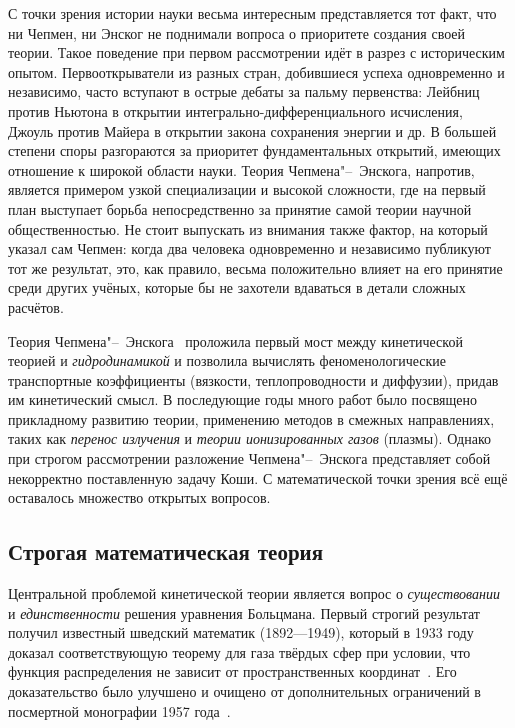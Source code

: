 \documentclass[a4paper, 12pt, oneside]{article} %
\begin{document}
С точки зрения истории науки весьма интересным представляется тот факт,
что ни Чепмен, ни Энског не поднимали вопроса о приоритете создания
своей теории. Такое поведение при первом рассмотрении идёт в разрез с
историческим опытом. Первооткрыватели из разных стран, добившиеся успеха
одновременно и независимо, часто вступают в острые дебаты за пальму
первенства: Лейбниц против Ньютона в открытии
интегрально-дифференциального исчисления, Джоуль против Майера в
открытии закона сохранения энергии и др. В большей степени споры
разгораются за приоритет фундаментальных открытий, имеющих отношение к
широкой области науки. Теория Чепмена"--~Энскога, напротив, является
примером узкой специализации и высокой сложности, где на первый план
выступает борьба непосредственно за принятие самой теории научной
общественностью. Не стоит выпускать из внимания также фактор, на который
указал сам Чепмен: когда два человека одновременно и независимо
публикуют тот же результат, это, как правило, весьма положительно влияет
на его принятие среди других учёных, которые бы не захотели вдаваться в
детали сложных расчётов.

Теория Чепмена"--~Энскога~\cite{chapman1960theory} проложила первый мост
между кинетической теорией и \emph{гидродинамикой} и позволила вычислять
феноменологические транспортные коэффициенты (вязкости, теплопроводности
и диффузии), придав им кинетический смысл. В последующие годы много
работ было посвящено прикладному развитию теории, применению методов в
смежных направлениях, таких как \emph{перенос излучения} и \emph{теории
ионизированных газов} (плазмы). Однако при строгом рассмотрении
разложение Чепмена"--~Энскога представляет собой некорректно
поставленную задачу Коши. С математической точки зрения всё ещё
оставалось множество открытых вопросов.

\subsection{Строгая математическая теория}

Центральной проблемой кинетической теории является вопрос о
\emph{существовании} и \emph{единственности} решения уравнения
Больцмана. Первый строгий результат получил известный шведский математик
 (1892---1949), который в 1933 году доказал
соответствующую теорему для газа твёрдых сфер при условии, что функция
распределения не зависит от пространственных
координат~\cite{carleman1933theorie}. Его доказательство было улучшено и
очищено от дополнительных ограничений в посмертной монографии 1957
года~\cite{carleman1960problems}.
\end{document}
